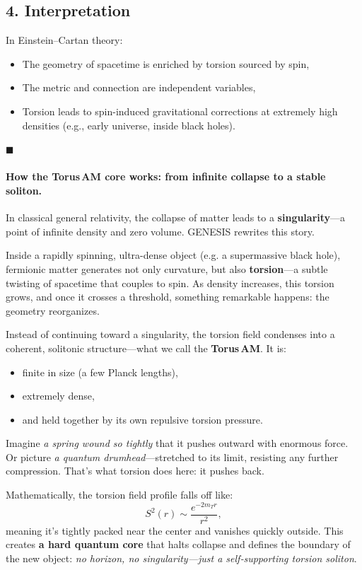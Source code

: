 \documentclass{article}
\begin{document}
\subsection*{4. Interpretation}
In Einstein--Cartan theory:
\begin{itemize}
  \item The geometry of spacetime is enriched by torsion sourced by spin,
  \item The metric and connection are independent variables,
  \item Torsion leads to spin-induced gravitational corrections at extremely high densities (e.g., early universe, inside black holes).
\end{itemize}

\hfill $\blacksquare$




\paragraph{How the Torus\,AM core works: from infinite collapse to a stable soliton.}

In classical general relativity, the collapse of matter leads to a \textbf{singularity}—a point of infinite density and zero volume. \textsc{GENESIS} rewrites this story.

Inside a rapidly spinning, ultra-dense object (e.g. a supermassive black hole), fermionic matter generates not only curvature, but also \textbf{torsion}—a subtle twisting of spacetime that couples to spin. As density increases, this torsion grows, and once it crosses a threshold, something remarkable happens: the geometry reorganizes.

Instead of continuing toward a singularity, the torsion field condenses into a coherent, solitonic structure—what we call the \textbf{Torus\,AM}. It is:
\begin{itemize}
  \item finite in size (a few Planck lengths),
  \item extremely dense,
  \item and held together by its own repulsive torsion pressure.
\end{itemize}

Imagine \textit{a spring wound so tightly} that it pushes outward with enormous force. Or picture \textit{a quantum drumhead}—stretched to its limit, resisting any further compression. That’s what torsion does here: it pushes back.

Mathematically, the torsion field profile falls off like:
\[
S^2(r) \sim \frac{e^{-2m_T r}}{r^2},
\]
meaning it's tightly packed near the center and vanishes quickly outside. This creates \textbf{a hard quantum core} that halts collapse and defines the boundary of the new object: \textit{no horizon, no singularity—just a self‑supporting torsion soliton}.
\end{document}
